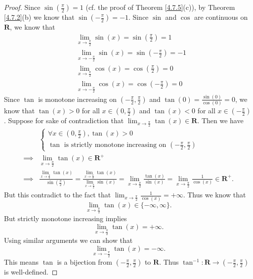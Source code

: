 \begin{proof}
    Since \(\sin(\frac{\pi}{2}) = 1\) (cf. the proof of Theorem \ref{4.7.5}(c)), by Theorem \ref{4.7.2}(b) we know that \(\sin(-\frac{\pi}{2}) = -1\).
    Since \(\sin\) and \(\cos\) are continuous on \(\mathbf{R}\), we know that
    \begin{align*}
         & \lim_{x \to \frac{\pi}{2}} \sin(x) = \sin(\frac{\pi}{2}) = 1    \\
         & \lim_{x \to -\frac{\pi}{2}} \sin(x) = \sin(-\frac{\pi}{2}) = -1 \\
         & \lim_{x \to \frac{\pi}{2}} \cos(x) = \cos(\frac{\pi}{2}) = 0    \\
         & \lim_{x \to -\frac{\pi}{2}} \cos(x) = \cos(-\frac{\pi}{2}) = 0
    \end{align*}
    Since \(\tan\) is monotone increasing on \((-\frac{\pi}{2}, \frac{\pi}{2})\) and \(\tan(0) = \frac{\sin(0)}{\cos(0)} = 0\), we know that \(\tan(x) > 0\) for all \(x \in (0, \frac{\pi}{2})\) and \(\tan(x) < 0\) for all \(x \in (-\frac{\pi}{2})\).
    Suppose for sake of contradiction that \(\lim_{x \to \frac{\pi}{2}} \tan(x) \in \mathbf{R}\).
    Then we have
    \begin{align*}
                 & \begin{cases}
                       \forall x \in (0, \frac{\pi}{2}), \tan(x) > 0 \\
                       \tan \text{ is strictly monotone increasing on } (-\frac{\pi}{2}, \frac{\pi}{2})
                   \end{cases}                                                                                                                                                                                      \\
        \implies & \lim_{x \to \frac{\pi}{2}} \tan(x) \in \mathbf{R}^+                                                                                                                                                                                                                  \\
        \implies & \frac{\lim_{x \to \frac{\pi}{2}} \tan(x)}{\sin(\frac{\pi}{2})} = \frac{\lim_{x \to \frac{\pi}{2}} \tan(x)}{\lim_{x \to \frac{\pi}{2}} \sin(x)} = \lim_{x \to \frac{\pi}{2}} \frac{\tan(x)}{\sin(x)} = \lim_{x \to \frac{\pi}{2}} \frac{1}{\cos(x)} \in \mathbf{R}^+.
    \end{align*}
    But this contradict to the fact that \(\lim_{x \to \frac{\pi}{2}} \frac{1}{\cos(x)} = +\infty\).
    Thus we know that
    \[
        \lim_{x \to \frac{\pi}{2}} \tan(x) \in \{-\infty, \infty\}.
    \]
    But strictly monotone increasing implies
    \[
        \lim_{x \to \frac{\pi}{2}} \tan(x) = +\infty.
    \]
    Using similar arguments we can show that
    \[
        \lim_{x \to -\frac{\pi}{2}} \tan(x) = -\infty.
    \]
    This means \(\tan\) is a bijection from \((-\frac{\pi}{2}, \frac{\pi}{2})\) to \(\mathbf{R}\).
    Thus \(\tan^{-1} : \mathbf{R} \to (-\frac{\pi}{2}, \frac{\pi}{2})\) is well-defined.


\end{proof}
